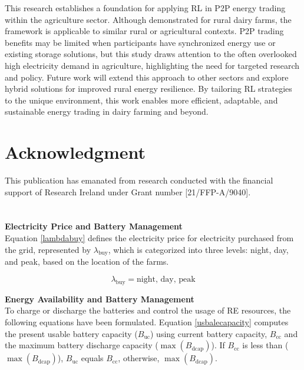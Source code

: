 \documentclass[preprint,12pt]{elsarticle}
\begin{document}
This research establishes a foundation for applying RL in P2P energy trading within the agriculture sector. Although demonstrated for rural dairy farms, the framework is applicable to similar rural or agricultural contexts. P2P trading benefits may be limited when participants have synchronized energy use or existing storage solutions, but this study draws attention to the often overlooked high electricity demand in agriculture, highlighting the need for targeted research and policy. Future work will extend this approach to other sectors and explore hybrid solutions for improved rural energy resilience. By tailoring RL strategies to the unique environment, this work enables more efficient, adaptable, and sustainable energy trading in dairy farming and beyond.






\section*{Acknowledgment}
This publication has emanated from research conducted with the financial support of Research Ireland under Grant number [21/FFP-A/9040].
    





\newpage

\appendix
\section{}
\label{loadandbatterymanagement}

\textbf{Electricity Price and Battery Management}\\

Equation \ref{lambdabuy} defines the electricity price for electricity purchased from the grid, represented by $\lambda_{\text{buy}}$, which is categorized into three levels: night, day, and peak, based on the location of the farms.

\begin{equation}
\label{lambdabuy}
\lambda_{\text{buy}} = \text{night, day, peak}
\end{equation}

\textbf{Energy Availability and Battery Management}\\

To charge or discharge the batteries and control the usage of RE resources, the following equations have been formulated. Equation \ref{usbalecapacity} computes the present usable battery capacity ($B_{\text{uc}}$) using current battery capacity, $B_{\text{cc}}$ and the maximum battery discharge capacity ($\max(B_{\text{dcap}})$). If $B_{\text{cc}}$ is less than ($\max(B_{\text{dcap}})$), $B_{\text{uc}}$ equals $B_{\text{cc}}$, otherwise, $\max(B_{\text{dcap}})$.
\end{document}
